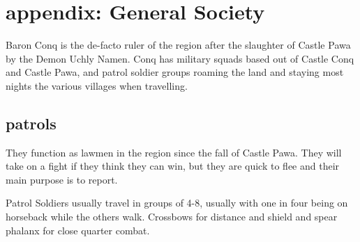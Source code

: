 




























\clearpage
\raggedbottom
\section*{appendix: General Society}

Baron Conq is the de-facto ruler of the region after the slaughter of Castle Pawa by the Demon Uchly Namen. Conq has military squads based out of Castle Conq and Castle Pawa, and patrol soldier groups roaming the land and staying most nights the various villages when travelling.


\subsection*{patrols}

They function as lawmen in the region since the fall of Castle Pawa. They will take on a fight if they think they can win, but they are quick to flee and their main purpose is to report.

Patrol Soldiers usually travel in groups of 4-8, usually with one in four being on horseback while the others walk. Crossbows for distance and shield and spear phalanx for close quarter combat.

